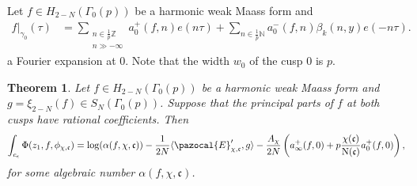 \documentclass[twoside,a4paper,10pt]{article} %
\newcommand{\8}{\infty}
\newcommand{\Z}{\mathbb{Z}}
\newcommand{\NN}{\mathbb{N}}
\newcommand{\cfrak}{\mathfrak{c}}
\newcommand{\N}{\mathrm{N}}
\newcommand{\Ecal}{\pazocal{E}}
\theoremstyle{mytheoremstyle}
\newtheorem{thm}{Theorem}[section]
\theoremstyle{remark}
\numberwithin{equation}{section}
\begin{document}
Let $f \in H_{2-N}(\Gamma_0(p))$ be a harmonic weak Maass form and
\begin{align}
f \vert_{\gamma_0}(\tau)& = \sum_{\substack{n \in \frac{1}{p}\Z \\ n \gg -\8}}a^+_0(f,n)e\left (n\tau \right ) + \sum_{n \in \frac{1}{p}\NN} a^-_0(f,n)\beta_k(n,y)e\left (-n\tau \right ) .
\end{align}
a Fourier expansion at $0$. Note that the width $w_0$ of the cusp $0$ is $p$.
\begin{thm}\label{main formula}Let $f \in H_{2-N}(\Gamma_0(p))$ be a harmonic weak Maass form and $g=\xi_{2-N}(f) \in S_N(\Gamma_0(p))$. Suppose that the principal parts of $f$ at both cusps have rational coefficients. Then
\begin{align}
\int_{c_\epsilon}\Phi(z_1,f,\phi_{\chi,\cfrak}) = \log(\alpha(f,\chi,\cfrak))-\frac{1}{2N} \langle \Ecal'_{\chi,\cfrak},g \rangle -\frac{A_{\chi}}{2N} \left (a^+_\8(f,0)+p \frac{\chi(\cfrak)}{\N(\cfrak)} a^+_0(f,0) \right ),
\end{align}
for some algebraic number $\alpha(f,\chi,\cfrak)$.
\end{thm}
\end{document}

